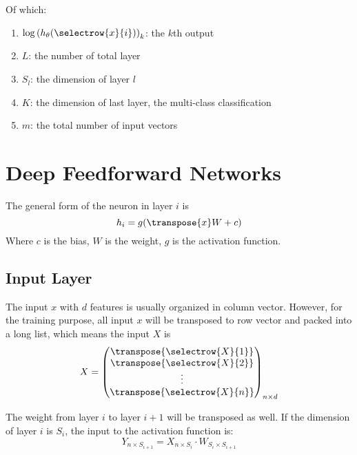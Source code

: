 Of which:
\begin{enumerate}
    \item $\log \left( h_\theta (\selectrow{x}{i}) \right)_k$: the $k$th output
    \item $L$: the number of total layer
    \item $S_l$: the dimension of layer $l$
    \item $K$: the dimension of last layer, the multi-class classification
    \item $m$: the total number of input vectors
\end{enumerate}



\section{Deep Feedforward Networks}



The general form of the neuron in layer $i$ is 
\begin{equation}
    h_i = g(\transpose{x} W + c)
\end{equation}
Where $c$ is the bias, $W$ is the weight, $g$ is the activation function.


\subsection{Input Layer}

\begin{definition}
    The input $x$ with $d$ features is usually organized in column vector. However, for the training purpose, all input $x$ will be transposed to row vector and packed into a long list, which means the input $X$ is
\begin{equation}
    X = \begin{pmatrix}
        \transpose{\selectrow{X}{1}} \\
        \transpose{\selectrow{X}{2}} \\
        \vdots \\
        \transpose{\selectrow{X}{n}} \\
    \end{pmatrix}_{n \times d}
\end{equation}
\end{definition}



The weight from layer $i$ to layer $i+1$ will be transposed as well. If the dimension of layer $i$ is $S_i$, the input to the activation function is:
\begin{equation}
    Y_{n \times S_{i+1}} = X_{n \times S_{i}} \cdot W_{S_{i} \times S_{i+1}}
\end{equation}



